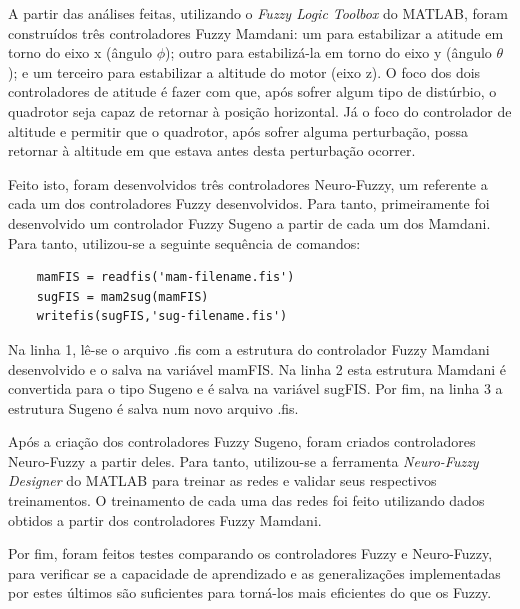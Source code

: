 A partir das análises feitas, utilizando o \textit{Fuzzy Logic Toolbox} do MATLAB\textregistered, foram construídos três controladores Fuzzy Mamdani: um para estabilizar a atitude em torno do eixo x (ângulo $\phi$); outro para estabilizá-la em torno do eixo y (ângulo $\theta$); e um terceiro para estabilizar a altitude do motor (eixo z). O foco dos dois controladores de atitude é fazer com que, após sofrer algum tipo de distúrbio, o quadrotor seja capaz de retornar à posição horizontal. Já o foco do controlador de altitude e permitir que o quadrotor, após sofrer alguma perturbação, possa retornar à altitude em que estava antes desta perturbação ocorrer.

Feito isto, foram desenvolvidos três controladores Neuro-Fuzzy, um referente a cada um dos controladores Fuzzy desenvolvidos. Para tanto, primeiramente foi desenvolvido um controlador Fuzzy Sugeno a partir de cada um dos Mamdani. Para tanto, utilizou-se a seguinte sequência de comandos:
\begin{lstlisting}
	mamFIS = readfis('mam-filename.fis')
	sugFIS = mam2sug(mamFIS)
	writefis(sugFIS,'sug-filename.fis')
\end{lstlisting}

Na linha 1, lê-se o arquivo {\ttfamily .fis} com a estrutura do controlador Fuzzy Mamdani desenvolvido e o salva na variável {\ttfamily mamFIS}. Na linha 2 esta estrutura Mamdani é convertida para o tipo Sugeno e é salva na variável {\ttfamily sugFIS}. Por fim, na linha 3 a estrutura Sugeno é salva num novo arquivo {\ttfamily .fis}.

Após a criação dos controladores Fuzzy Sugeno, foram criados controladores Neuro-Fuzzy a partir deles. Para tanto, utilizou-se a ferramenta \textit{Neuro-Fuzzy Designer} do MATLAB para treinar as redes e validar seus respectivos treinamentos. O treinamento de cada uma das redes foi feito utilizando dados obtidos a partir dos controladores Fuzzy Mamdani.

Por fim, foram feitos testes comparando os controladores Fuzzy e Neuro-Fuzzy, para verificar se a capacidade de aprendizado e as generalizações implementadas por estes últimos são suficientes para torná-los mais eficientes do que os Fuzzy.